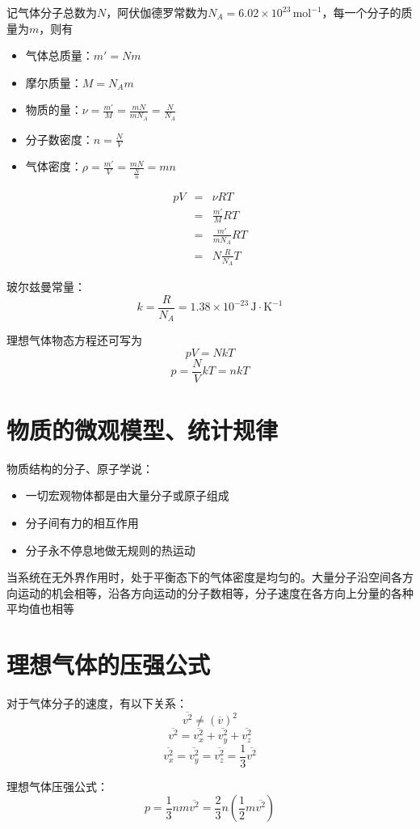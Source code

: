 \documentclass[12pt, a4paper, twoside]{ctexbook}
\begin{document}
记气体分子总数为$N$，阿伏伽德罗常数为$N_A=6.02\times10^{23}\,\mathrm{mol}^{-1}$，每一个分子的质量为$m$，则有
\begin{itemize}
    \item {\sonti 气体总质量}：$m'=Nm$
    \item {\sonti 摩尔质量}：$M=N_Am$
    \item {\sonti 物质的量}：$\nu=\frac{m'}{M}=\frac{mN}{mN_A}=\frac{N}{N_A}$
    \item {\sonti 分子数密度}：$n=\frac{N}{V}$
    \item {\sonti 气体密度}：$\rho=\frac{m'}{V}=\frac{mN}{\frac{N}{n}}=mn$
\end{itemize}
\begin{eqnarray}
    pV&=&\nu RT \nonumber      \\
    ~&=&\frac{m'}{M}RT \nonumber    \\
    ~&=&\frac{m'}{mN_A}RT \nonumber		\\
    ~&=&N\frac{R}{N_A}T \nonumber
\end{eqnarray}

{\sonti 玻尔兹曼常量}：
$$
k=\frac{R}{N_A}=1.38\times10^{-23}\,\mathrm{J}\cdot\mathrm{K}^{-1}
$$

理想气体物态方程还可写为
$$
pV=NkT
$$
$$
p=\frac{N}{V}kT=nkT
$$
\section{物质的微观模型、统计规律}
{\sonti 物质结构的分子、原子学说}：
\begin{itemize}
    \item 一切宏观物体都是由大量分子或原子组成
    \item 分子间有力的相互作用
    \item 分子永不停息地做无规则的热运动
\end{itemize}

当系统在无外界作用时，处于平衡态下的气体密度是均匀的。大量分子沿空间各方向运动的机会相等，沿各方向运动的分子数相等，分子速度在各方向上分量的各种平均值也相等
\section{理想气体的压强公式}
对于气体分子的速度，有以下关系：
$$
\overline{v^2}\ne \left(\overline{v}\right)^2
$$
$$
\overline{v^2}=\overline{v_x^2}+\overline{v_y^2}+\overline{v_z^2}
$$
$$
\overline{v_x^2}=\overline{v_y^2}=\overline{v_z^2}=\frac{1}{3}\overline{v^2}
$$

{\sonti 理想气体压强公式}：
$$
p=\frac{1}{3}nm\overline{v^2}=\frac{2}{3}n\left(\frac{1}{2}m\overline{v^2}\right)
$$
\end{document}
